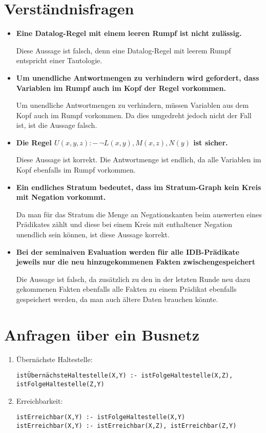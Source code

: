 \documentclass{scrartcl}
\begin{document}
\maketitle

\section{Verständnisfragen}
\begin{itemize}
    \item\textbf{Eine Datalog-Regel mit einem leeren Rumpf ist nicht zulässig.}
    
    Diese Aussage ist falsch, denn eine Datalog-Regel mit leerem Rumpf entspricht einer Tautologie.
    \item \textbf{Um unendliche Antwortmengen zu verhindern wird gefordert, dass Variablen im Rumpf auch im Kopf der Regel vorkommen.}
    
    Um unendliche Antwortmengen zu verhindern, müssen Variablen aus dem Kopf auch im Rumpf vorkommen. Da dies umgedreht jedoch nicht der Fall ist, ist die Aussage falsch.
    \item\textbf{Die Regel $U(x,y,z):-\, \neg L(x,y), M(x,z), N(y)$ ist sicher.}
    
    Diese Aussage ist korrekt. Die Antwortmenge ist endlich, da alle Variablen im Kopf ebenfalls im Rumpf vorkommen.
    \item \textbf{Ein endliches Stratum bedeutet, dass im Stratum-Graph kein Kreis mit Negation vorkommt.}
    
    Da man für das Stratum die Menge an Negationskanten beim auswerten eines Prädikates zählt und diese bei einem Kreis mit enthaltener Negation unendlich sein können, ist diese Aussage korrekt.
    \item \textbf{Bei der seminaiven Evaluation werden für alle IDB-Prädikate jeweils nur die neu hinzugekommenen Fakten zwischengespeichert}
    
    Die Aussage ist falsch, da zusätzlich zu den in der letzten Runde neu dazu gekommenen Fakten ebenfalls alle Fakten zu einem Prädikat ebenfalls gespeichert werden, da man auch ältere Daten brauchen könnte.
\end{itemize}
\section{Anfragen über ein Busnetz}
\begin{enumerate}
\item Übernächste Haltestelle:\\
\begin{lstlisting}
istÜbernächsteHaltestelle(X,Y) :- istFolgeHaltestelle(X,Z), istFolgeHaltestelle(Z,Y)
\end{lstlisting}
\item Erreichbarkeit:\\
\begin{lstlisting}
istErreichbar(X,Y) :- istFolgeHaltestelle(X,Y)
istErreichbar(X,Y) :- istErreichbar(X,Z), istErreichbar(Z,Y)
\end{lstlisting}
\end{enumerate}
\end{document}
